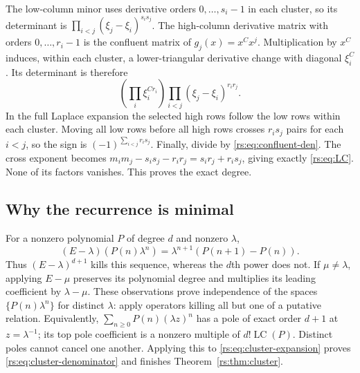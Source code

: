 \documentclass[11pt]{article}
\theoremstyle{definition}
\theoremstyle{remark}
\newcommand{\LC}{\operatorname{LC}}
\theoremstyle{definition}
\theoremstyle{plain}
\numberwithin{equation}{section}
\begin{document}
The low-column minor uses derivative orders $0,\ldots,s_i-1$ in each cluster,
so its determinant is
$\prod_{i<j}(\xi_j-\xi_i)^{s_i s_j}$.
The high-column derivative matrix with orders $0,\ldots,r_i-1$ is the
confluent matrix of $g_j(x)=x^C x^j$. Multiplication by $x^C$ induces, within
each cluster, a lower-triangular derivative change with diagonal $\xi_i^C$.
Its determinant is therefore
\[
 \left(\prod_i\xi_i^{C r_i}\right)
 \prod_{i<j}(\xi_j-\xi_i)^{r_i r_j}.
\]
In the full Laplace expansion the selected high rows follow the low rows
within each cluster. Moving all low rows before all high rows crosses
$r_i s_j$ pairs for each $i<j$, so the sign is
$(-1)^{\sum_{i<j}r_i s_j}$. Finally, divide by
\eqref{rs:eq:confluent-den}. The cross exponent becomes
$m_i m_j-s_i s_j-r_i r_j=s_i r_j+r_i s_j$, giving exactly
\eqref{rs:eq:LC}. None of its factors vanishes. This proves the exact degree.

\subsection{Why the recurrence is minimal}
For a nonzero polynomial $P$ of degree $d$ and nonzero $\lambda$,
\[
 (E-\lambda)(P(n)\lambda^n)
 =\lambda^{n+1}(P(n+1)-P(n)).
\]
Thus $(E-\lambda)^{d+1}$ kills this sequence, whereas the $d$th power does
not. If $\mu\ne\lambda$, applying $E-\mu$ preserves its polynomial degree
and multiplies its leading coefficient by $\lambda-\mu$.
These observations prove independence of the spaces
$\{P(n)\lambda^n\}$ for distinct $\lambda$: apply operators killing all
but one of a putative relation.
Equivalently, $\sum_{n\ge0}P(n)(\lambda z)^n$ has a pole of exact order
$d+1$ at $z=\lambda^{-1}$; its top pole coefficient is a nonzero multiple
of $d!\LC(P)$. Distinct poles cannot cancel one another. Applying this to
\eqref{rs:eq:cluster-expansion} proves \eqref{rs:eq:cluster-denominator} and
finishes Theorem~\ref{rs:thm:cluster}.
\end{document}
